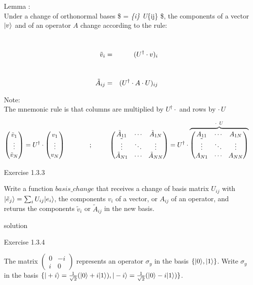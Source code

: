 \documentclass[11pt]{article}
\begin{document}
    Lemma : \\
Under a change of orthonormal bases \$  \to {} =
\sum\emph{\{i\} U}\{ij\} \$, the components of a vector
\(|v\rangle\) and of an operator \(A\) change according to the rule:

\strut \\
\begin{eqnarray}
\tilde v_i &=& (U^\dagger \cdot v)_i \\ \rule{0mm}{12mm}
\tilde A_{ij} &=& (U^\dagger \cdot A \cdot U)_{ij}
\end{eqnarray}

    Note: \\
The mnemonic rule is that columns are multiplied by \(U^\dagger \cdot\)
and rows by \(\cdot\, U\)

\[
\begin{pmatrix} \tilde v_1 \\ \vdots \\ \tilde v_N \end{pmatrix} = 
U^\dagger \cdot \begin{pmatrix} v_1 \\ \vdots \\  v_N \end{pmatrix} ~~~~
~~~~~~~;~~~~~~~~
\begin{pmatrix} 
\tilde A_{11} & \cdots & \tilde A_{1N} \\
\tilde \vdots & \ddots & \vdots  \\
\tilde A_{N1} & \cdots & \tilde A_{NN} 
\end{pmatrix} 
 =  U^\dagger\cdot
 \overbrace{\begin{pmatrix} 
 A_{11} & \cdots &  A_{1N} \\
\tilde \vdots & \ddots & \vdots  \\
 A_{N1} & \cdots &  A_{NN} 
\end{pmatrix} }^{\large \cdot ~ U}
\]

    Exercise 1.3.3\(~\)

Write a function \(basis\_change\) that receives a change of basis
matrix \(U_{ij}\) with \(|\tilde e_j\rangle = \sum_i U_{ij} |e_i\rangle\),
the components \(v_i\) of a vector, or \(A_{ij}\) of an operator, and
returns the components \(\tilde v_i\) or \(\tilde A_{ij}\) in the new
basis.

solution

Exercise 1.3.4\(~\)

The matrix \(\begin{pmatrix} 0 & -i \\ i & 0 \end{pmatrix}\) represents
an operator \(\sigma_y\) in the basis \(\{|0\rangle, |1\rangle\}\). Write
\(\sigma_y\) in the basis
\(\{|+i\rangle = \frac{1}{\sqrt{2}}(|0\rangle + i |1\rangle), |-i\rangle = \frac{1}{\sqrt{2}}(|0\rangle - i |1\rangle)\}\).
\end{document}
